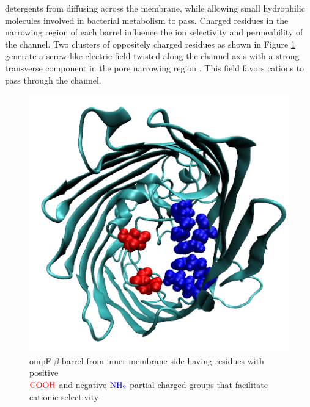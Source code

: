 \documentclass{article}[12pt]
\numberwithin{equation}{section}
\begin{document}
detergents from diffusing across the membrane, while allowing small hydrophilic
molecules involved in bacterial metabolism to pass. Charged residues in the
narrowing region of each barrel influence the ion selectivity and permeability
of the channel. Two clusters of oppositely charged residues as shown in Figure
\ref{fig:ompF-charges} generate a screw-like electric field twisted along the
channel axis with a strong transverse component in the pore narrowing region
\cite{Novikova2009}. This field favors cations to pass through the channel.
\begin{figure}[H]
	\centering{}
	\captionsetup{justification=centering}
	\includegraphics[scale=0.5]{ompf-charges}
\caption{ompF $\beta$-barrel from inner membrane side having residues with
positive \\ $\color{red}{\mathrm{COOH}}$ and negative $\color{blue}{\mathrm{NH_2}}$ partial
charged groups that facilitate cationic selectivity}
\label{fig:ompF-charges}
\end{figure}
\end{document}
